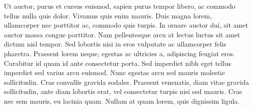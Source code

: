 Ut auctor, purus et cursus euismod, sapien purus tempor libero, ac commodo tellus nulla quis dolor. Vivamus quis enim mauris. Duis magna lorem, ullamcorper nec porttitor ac, commodo quis turpis. In ornare auctor dui, sit amet auctor massa congue porttitor. Nam pellentesque arcu at lectus luctus sit amet dictum nisl tempor. Sed lobortis nisi in eros vulputate ac ullamcorper felis pharetra. Praesent lorem neque, egestas ac ultricies a, adipiscing feugiat eros. Curabitur id quam id ante consectetur porta. Sed imperdiet nibh eget tellus imperdiet sed varius arcu euismod. Nunc egestas arcu sed mauris molestie sollicitudin. Cras convallis gravida sodales. Praesent venenatis, diam vitae gravida sollicitudin, ante diam lobortis erat, vel consectetur turpis nisi sed mauris. Cras nec sem mauris, eu lacinia quam. Nullam at quam lorem, quis dignissim ligula.


